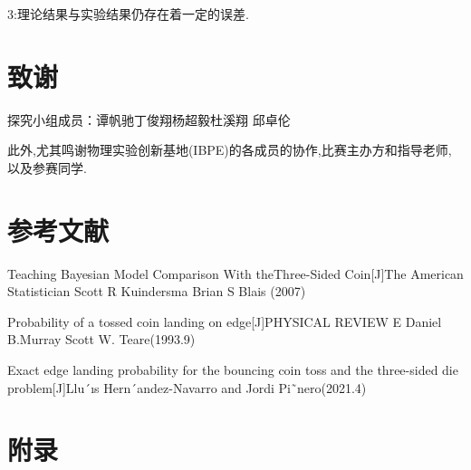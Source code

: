\documentclass[UTF8]{gapd}
\begin{document}
3:理论结果与实验结果仍存在着一定的误差.
\section*{致谢}
探究小组成员：谭帆驰\quad  丁俊翔\quad  杨超毅\quad  杜溪翔 \quad 邱卓伦  

此外,尤其鸣谢物理实验创新基地(IBPE)的各成员的协作,比赛主办方和指导老师,以及参赛同学.



\section*{参考文献}
\begin{thebibliography}{2}

Teaching Bayesian Model Comparison With theThree-Sided Coin[J]The American Statistician Scott R Kuindersma  Brian S Blais (2007)

Probability of a tossed coin landing on edge[J]PHYSICAL REVIEW E Daniel B.Murray  Scott W. Teare(1993.9)

Exact edge landing probability for the bouncing coin toss and the three-sided die problem[J]Llu´ıs Hern´andez-Navarro and Jordi Pi˜nero(2021.4)
\end{thebibliography}
\section{附录}
\end{document}
